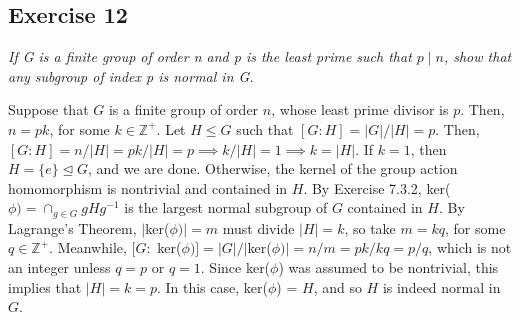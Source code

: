 \subsection*{Exercise 12}
\textit{If G is a finite group of order n and p is the least prime such that $p \mid n$, show that any subgroup of index p is normal in G.}

\vspace{5 mm}
Suppose that $G$ is a finite group of order $n$, whose least prime divisor is $p$. Then, $n = pk$, for some $k \in \mathbb{Z}^+$. Let $H \le G$ such that $[G:H] = |G|/|H| = p$. Then, $[G:H] = n/|H| = pk/|H| = p \implies k/|H| = 1 \implies k = |H|$. If $k = 1$, then $H = \{e\} \trianglelefteq G$, and we are done. Otherwise, the kernel of the group action homomorphism is nontrivial and contained in $H$. By Exercise 7.3.2, ker($\phi) = \cap_{g \in G} gHg^{-1}$ is the largest normal subgroup of $G$ contained in $H$. By Lagrange's Theorem, $|$ker($\phi)| = m$ must divide $|H| = k$, so take $m = kq$, for some $q \in \mathbb{Z}^+$. Meanwhile, $[G:$ ker($\phi)] = |G|/|$ker($\phi)| = n/m = pk/kq = p/q$, which is not an integer unless $q = p$ or $q = 1$. Since ker($\phi$) was assumed to be nontrivial, this implies that $|H| = k = p$. In this case, ker($\phi$) = $H$, and so $H$ is indeed normal in $G$.
